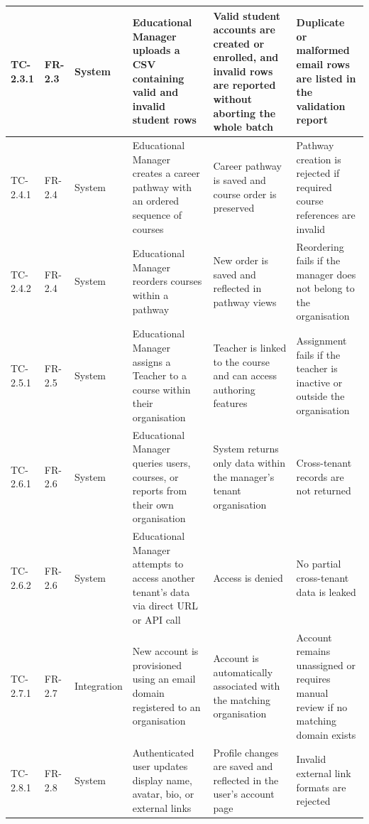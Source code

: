 \begin{longtable}{|>{\centering\arraybackslash}m{}|>{\centering\arraybackslash}m{}|>{\centering\arraybackslash}m{}|m{}|m{}|m{}|}
TC-2.3.1 & FR-2.3 & System & Educational Manager uploads a CSV containing valid and invalid student rows & Valid student accounts are created or enrolled, and invalid rows are reported without aborting the whole batch & Duplicate or malformed email rows are listed in the validation report \\ \hline

TC-2.4.1 & FR-2.4 & System & Educational Manager creates a career pathway with an ordered sequence of courses & Career pathway is saved and course order is preserved & Pathway creation is rejected if required course references are invalid \\ \hline
TC-2.4.2 & FR-2.4 & System & Educational Manager reorders courses within a pathway & New order is saved and reflected in pathway views & Reordering fails if the manager does not belong to the organisation \\ \hline

TC-2.5.1 & FR-2.5 & System & Educational Manager assigns a Teacher to a course within their organisation & Teacher is linked to the course and can access authoring features & Assignment fails if the teacher is inactive or outside the organisation \\ \hline

TC-2.6.1 & FR-2.6 & System & Educational Manager queries users, courses, or reports from their own organisation & System returns only data within the manager's tenant organisation & Cross-tenant records are not returned \\ \hline
TC-2.6.2 & FR-2.6 & System & Educational Manager attempts to access another tenant's data via direct URL or API call & Access is denied & No partial cross-tenant data is leaked \\ \hline

TC-2.7.1 & FR-2.7 & Integration & New account is provisioned using an email domain registered to an organisation & Account is automatically associated with the matching organisation & Account remains unassigned or requires manual review if no matching domain exists \\ \hline

TC-2.8.1 & FR-2.8 & System & Authenticated user updates display name, avatar, bio, or external links & Profile changes are saved and reflected in the user's account page & Invalid external link formats are rejected \\ \hline


\end{longtable}
